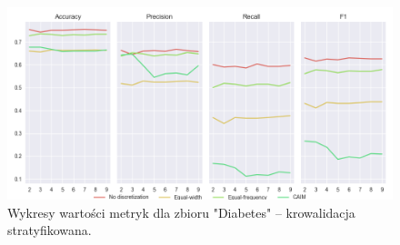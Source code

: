 \begin{figure}[H]
    \includegraphics[width=\textwidth]{img/cv_scores_stratifiedkfold/scoring_stratifiedkfold_diabetes.png}
    \caption{Wykresy wartości metryk dla zbioru "Diabetes" -- krowalidacja stratyfikowana.}
\end{figure}

